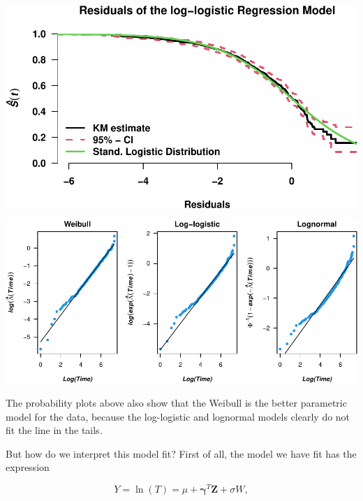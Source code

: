 \documentclass[
]{article}
\newenvironment{Shaded}{\begin{snugshade}}{\end{snugshade}}
\newcommand{\AttributeTok}[1]{\textcolor[rgb]{0.77,0.63,0.00}{#1}}
\newcommand{\DecValTok}[1]{\textcolor[rgb]{0.00,0.00,0.81}{#1}}
\newcommand{\FunctionTok}[1]{\textcolor[rgb]{0.00,0.00,0.00}{#1}}
\newcommand{\NormalTok}[1]{#1}
\newcommand{\SpecialCharTok}[1]{\textcolor[rgb]{0.00,0.00,0.00}{#1}}
\newcommand{\StringTok}[1]{\textcolor[rgb]{0.31,0.60,0.02}{#1}}
\begin{document}
\includegraphics{practical_files/figure-latex/fit-loglog-1.pdf}

\begin{Shaded}
\end{Shaded}

\includegraphics{practical_files/figure-latex/cumhaz-plot-1.pdf}

The probability plots above also show that the Weibull is the better parametric model for the data, because the log-logistic and lognormal models clearly do not fit the line in the tails.

But how do we interpret this model fit? First of all, the model we have fit has the expression

\[
Y = \ln(T) = \mu + \mathbf{\gamma}^T\mathbf{Z} + \sigma W,  
\]
\end{document}
